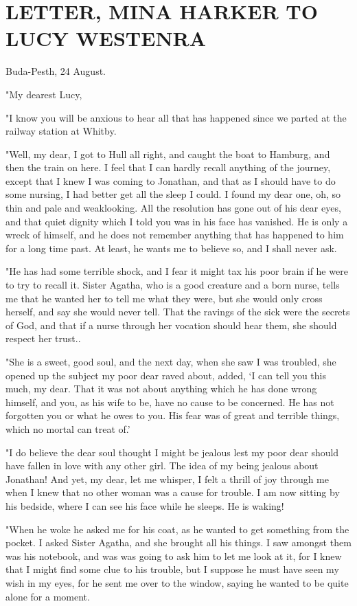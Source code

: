 \chapter{LETTER, MINA HARKER TO LUCY WESTENRA}

Buda-Pesth, 24 August. 

"My dearest Lucy, 

"I know you will be anxious to hear all that has happened since we parted at the railway station at Whitby. 

"Well, my dear, I got to Hull all right, and caught the boat to Hamburg, and then the train on here. I feel that I can hardly recall anything of the journey, except that I knew I was coming to Jonathan, and that as I should have to do some nursing, I had better get all the sleep I could. I found my dear one, oh, so thin and pale and weaklooking. All the resolution has gone out of his dear eyes, and that quiet dignity which I told you was in his face has vanished. He is only a wreck of himself, and he does not remember anything that has happened to him for a long time past. At least, he wants me to believe so, and I shall never ask. 

"He has had some terrible shock, and I fear it might tax his poor brain if he were to try to recall it. Sister Agatha, who is a good creature and a born nurse, tells me that he wanted her to tell me what they were, but she would only cross herself, and say she would never tell. That the ravings of the sick were the secrets of God, and that if a nurse through her vocation should hear them, she should respect her trust.. 

"She is a sweet, good soul, and the next day, when she saw I was troubled, she opened up the subject my poor dear raved about, added, `I can tell you this much, my dear. That it was not about anything which he has done wrong himself, and you, as his wife to be, have no cause to be concerned. He has not forgotten you or what he owes to you. His fear was of great and terrible things, which no mortal can treat of.' 

"I do believe the dear soul thought I might be jealous lest my poor dear should have fallen in love with any other girl. The idea of my being jealous about Jonathan! And yet, my dear, let me whisper, I felt a thrill of joy through me when I knew that no other woman was a cause for trouble. I am now sitting by his bedside, where I can see his face while he sleeps. He is waking! 

"When he woke he asked me for his coat, as he wanted to get something from the pocket. I asked Sister Agatha, and she brought all his things. I saw amongst them was his notebook, and was was going to ask him to let me look at it, for I knew that I might find some clue to his trouble, but I suppose he must have seen my wish in my eyes, for he sent me over to the window, saying he wanted to be quite alone for a moment. 

